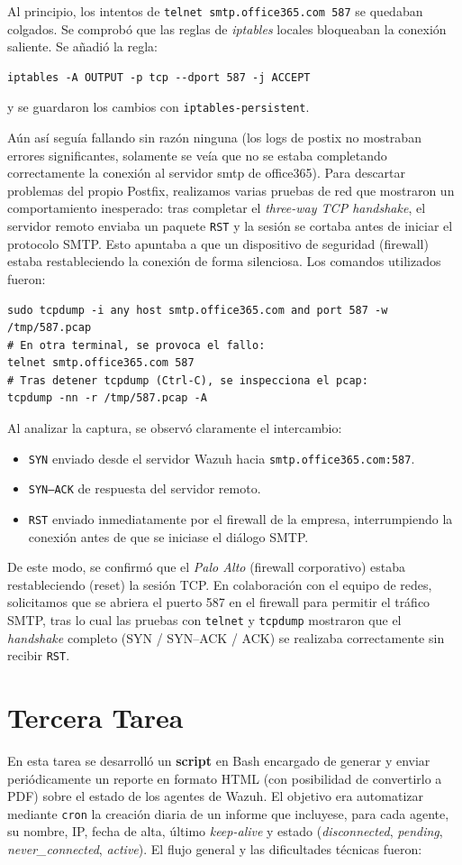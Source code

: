 Al principio, los intentos de \texttt{telnet smtp.office365.com 587} se quedaban colgados. Se comprobó que las reglas de \emph{iptables} locales bloqueaban la conexión saliente. Se añadió la regla:
\begin{verbatim}
iptables -A OUTPUT -p tcp --dport 587 -j ACCEPT
\end{verbatim}
y se guardaron los cambios con \texttt{iptables-persistent}.

Aún así seguía fallando sin razón ninguna (los logs de postix no mostraban errores significantes, solamente se veía que no se estaba completando correctamente la conexión al servidor smtp de office365). Para descartar problemas del propio Postfix, realizamos varias pruebas de red que mostraron un comportamiento inesperado: tras completar el \emph{three-way TCP handshake}, el servidor remoto enviaba un paquete \texttt{RST} y la sesión se cortaba antes de iniciar el protocolo SMTP. Esto apuntaba a que un dispositivo de seguridad (firewall) estaba restableciendo la conexión de forma silenciosa. Los comandos utilizados fueron:
\begin{verbatim}
sudo tcpdump -i any host smtp.office365.com and port 587 -w /tmp/587.pcap
# En otra terminal, se provoca el fallo:
telnet smtp.office365.com 587
# Tras detener tcpdump (Ctrl-C), se inspecciona el pcap:
tcpdump -nn -r /tmp/587.pcap -A
\end{verbatim}
Al analizar la captura, se observó claramente el intercambio:
\begin{itemize}
  \item \texttt{SYN} enviado desde el servidor Wazuh hacia \texttt{smtp.office365.com:587}.
  \item \texttt{SYN–ACK} de respuesta del servidor remoto.
  \item \texttt{RST} enviado inmediatamente por el firewall de la empresa, interrumpiendo la conexión antes de que se iniciase el diálogo SMTP.
\end{itemize}
De este modo, se confirmó que el \emph{Palo Alto} (firewall corporativo) estaba restableciendo (reset) la sesión TCP. En colaboración con el equipo de redes, solicitamos que se abriera el puerto 587 en el firewall para permitir el tráfico SMTP, tras lo cual las pruebas con \texttt{telnet} y \texttt{tcpdump} mostraron que el \emph{handshake} completo (SYN / SYN–ACK / ACK) se realizaba correctamente sin recibir \texttt{RST}.

\section{Tercera Tarea}
En esta tarea se desarrolló un \textbf{script} en Bash encargado de generar y enviar periódicamente un reporte en formato HTML (con posibilidad de convertirlo a PDF) sobre el estado de los agentes de Wazuh. El objetivo era automatizar mediante \texttt{cron} la creación diaria de un informe que incluyese, para cada agente, su nombre, IP, fecha de alta, último \emph{keep-alive} y estado (\emph{disconnected}, \emph{pending}, \emph{never\_connected}, \emph{active}). El flujo general y las dificultades técnicas fueron:

